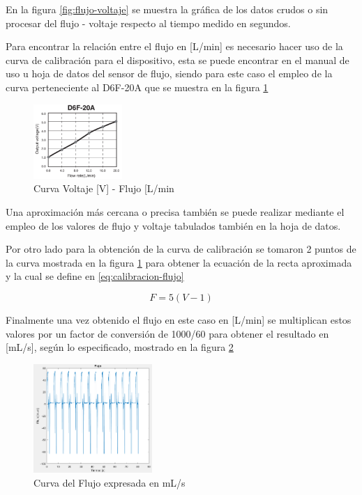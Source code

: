 \documentclass[conference]{IEEEtran}
\begin{document}
	En la figura \ref{fig:flujo-voltaje} se muestra la gráfica de los datos crudos o sin procesar del flujo - voltaje respecto al tiempo medido en segundos.
	
	Para encontrar la relación entre el flujo en [L/min] es necesario hacer uso de la curva de calibración para el dispositivo, esta se puede encontrar en el manual de uso u hoja de datos del sensor de flujo, siendo para este caso el empleo de la curva perteneciente al D6F-20A que se muestra en la figura \ref{fig:calibracion-flujo}
	
	\begin{figure}[h]
		\centering
		\includegraphics[width=0.3\textwidth]{media/calibracion-flujo}
		\caption{Curva Voltaje [V] - Flujo [L/min}
		\label{fig:calibracion-flujo}
	\end{figure}
	
	Una aproximación más cercana o precisa también se puede realizar mediante el empleo de los valores de flujo y voltaje tabulados también en la hoja de datos.
	
	Por otro lado para la obtención de la curva de calibración se tomaron 2 puntos de la curva mostrada en la figura \ref{fig:calibracion-flujo} para obtener la ecuación de la recta aproximada y la cual se define en \ref{eq:calibracion-flujo}
	
	\begin{equation}
		F = 5(V-1)
		\label{eq:calibracion-flujo}
	\end{equation}
	
	Finalmente una vez obtenido el flujo en este caso en [L/min] se multiplican estos valores por un factor de conversión de 1000/60 para obtener el resultado en [mL/s], según lo especificado, mostrado en la figura \ref{fig:flujo}
	
	\begin{figure}[h]
		\centering
		\includegraphics[width=0.4\textwidth]{media/flujo}
		\caption{Curva del Flujo expresada en mL/s}
		\label{fig:flujo}
	\end{figure}
	
\end{document}
